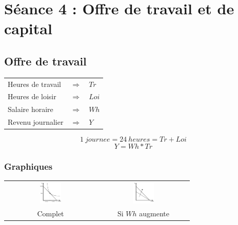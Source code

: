 \section{Séance 4 : Offre de travail et de capital}


\subsection{Offre de travail}



\begin{tabular}{lll}
	Heures de travail & $\Rightarrow$ & $Tr$\\
	Heures de loisir  & $\Rightarrow$ & $Loi$\\
	Salaire horaire   & $\Rightarrow$ & $Wh$\\
	Revenu journalier & $\Rightarrow$ & $Y$\\
\end{tabular}
$$1\ journee = 24\ heures = Tr + Loi$$
$$Y = Wh * Tr$$



\subsubsection{Graphiques}



\begin{center}
	\begin{tabular}{cc}
		\includegraphics[width=0.25\textwidth]{images/graph_offre_de_travail.pdf} & \includegraphics[width=0.25\textwidth]{images/graph_offre_de_travail_wh_augmente.pdf}\\
		Complet                                                                   & Si $Wh$ augmente
	\end{tabular}
\end{center}



